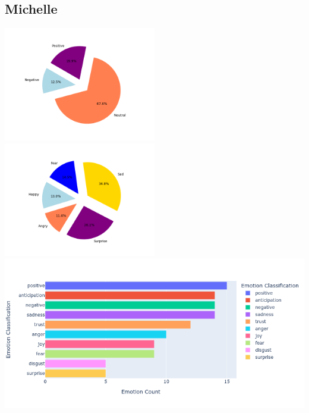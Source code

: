 \documentclass[a4paper,12pt]{article}
\begin{document}
	\subsection{Michelle}
	{\includegraphics[height=5cm]{michellesVaderEmotionalPie.png}}
	{\includegraphics[height=5cm]{michellesEmotionalPie.png}}\\
	{\includegraphics[width=17cm]{michelleNrcImage.png}}\\
	\clearpage
\end{document}
